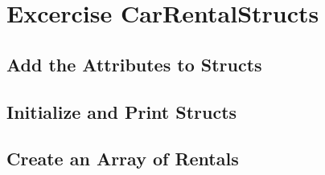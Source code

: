 \section{Excercise CarRentalStructs}
\label{sec:car_rental_structs}

\subsection*{Add the Attributes to Structs}

\subsection*{Initialize and Print Structs}

\subsection*{Create an Array of Rentals}
